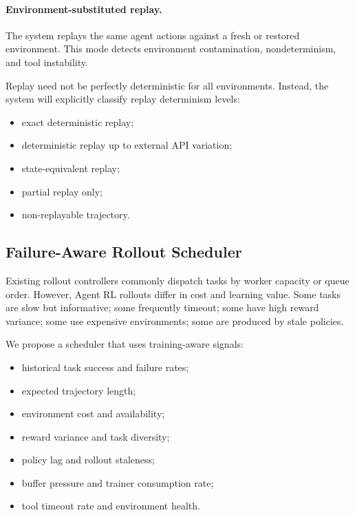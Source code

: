 \documentclass[11pt]{article}
\begin{document}
\paragraph{Environment-substituted replay.}
The system replays the same agent actions against a fresh or restored environment.
This mode detects environment contamination, nondeterminism, and tool instability.

Replay need not be perfectly deterministic for all environments.
Instead, the system will explicitly classify replay determinism levels:

\begin{itemize}[leftmargin=*]
    \item exact deterministic replay;
    \item deterministic replay up to external API variation;
    \item state-equivalent replay;
    \item partial replay only;
    \item non-replayable trajectory.
\end{itemize}

\subsection{Failure-Aware Rollout Scheduler}

Existing rollout controllers commonly dispatch tasks by worker capacity or queue order.
However, Agent RL rollouts differ in cost and learning value.
Some tasks are slow but informative; some frequently timeout; some have high reward variance; some use expensive environments; some are produced by stale policies.

We propose a scheduler that uses training-aware signals:

\begin{itemize}[leftmargin=*]
    \item historical task success and failure rates;
    \item expected trajectory length;
    \item environment cost and availability;
    \item reward variance and task diversity;
    \item policy lag and rollout staleness;
    \item buffer pressure and trainer consumption rate;
    \item tool timeout rate and environment health.
\end{itemize}
\end{document}
